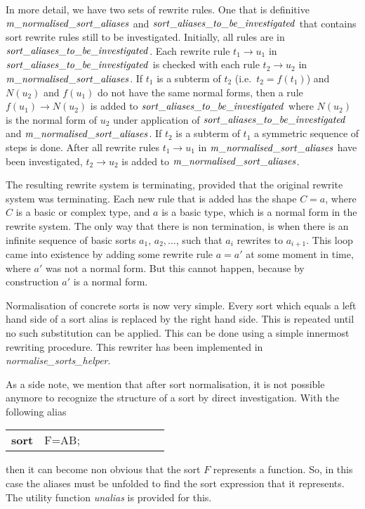 \documentclass{article}
\makeatletter
\newenvironment{mcrl2}%
{\begin{trivlist}
\item\begin{tabular}{@{}>{\bf}p{2.3em}L@{\ }L@{\ }L@{\ }L@{\ }L@{\ }L@{\ }L@{\ }L}}%
{\end{tabular}\end{trivlist}}
\makeatother
\begin{document}
In more detail, we have two sets of rewrite rules. One that is definitive
${\it m\_normalised\_sort\_aliases}$ and $\it sort\_aliases\_to\_be\_investigated$ 
that contains sort rewrite rules
still to be investigated. Initially, all rules are in 
$\it sort\_aliases\_to\_be\_investigated$. Each rewrite rule $t_1\rightarrow u_1$
in $\it sort\_aliases\_to\_be\_investigated$ is checked with
each rule $t_2\rightarrow u_2$ in ${\it m\_normalised\_sort\_aliases}$.
If $t_1$ is a subterm of $t_2$ (i.e.\ $t_2=f(t_1)$) and 
$N(u_2)$ and $f(u_1)$ do not have the same normal forms, then a rule $f(u_1)\rightarrow
N(u_2)$ is added to $\it sort\_aliases\_to\_be\_investigated$ where $N(u_2)$ is
the normal form of $u_2$ under application of $\it sort\_aliases\_to\_be\_investigated$ and
${\it m\_normalised\_sort\_aliases}$.
If $t_2$ is a subterm of $t_1$ a symmetric sequence of steps is done.
After all rewrite rules $t_1\rightarrow u_1$ in ${\it m\_normalised\_sort\_aliases}$
have been investigated, $t_2\rightarrow u_2$ is added to 
${\it m\_normalised\_sort\_aliases}$.

The resulting rewrite system is terminating, provided that the original rewrite system
was terminating. Each new rule that is added has the shape $C = a$, where $C$ is
a basic or complex type, and $a$ is a basic type, which is a normal form in the
rewrite system. The only way that there is non termination, is when there
is an infinite sequence of basic sorts $a_1$, $a_2,\ldots$, such that $a_i$ rewrites
to $a_{i+1}$. This loop came into existence by adding some rewrite rule $a=a'$ at
some moment in time, where $a'$ was not a normal form. But this cannot happen,
because by construction $a'$ is a normal form.

Normalisation of concrete sorts is now very simple. Every sort which equals a
left hand side of a sort alias is replaced by the right hand side. This is repeated
until no such substitution can be applied. This can be done using a simple 
innermost rewriting procedure. This rewriter has been implemented in 
{\it normalise\_sorts\_helper}.

As a side note, we mention that after sort normalisation, it is not possible
anymore to recognize the structure of a sort by direct investigation. With the following
alias
\begin{mcrl2}
sort&F=A\rightarrow B;
\end{mcrl2}
then it can become non obvious that the sort $F$ represents a function. 
So, in this case the aliases must be unfolded to find the sort expression
that it represents. The utility function {\it unalias} is provided for this.
\end{document}
